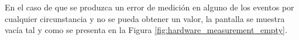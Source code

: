 \documentclass[12pt,a4paper, twoside]{report}
\begin{document}
%	
	
	En el caso de que se produzca un error de medición en alguno de los eventos por cualquier circunstancia y no se pueda obtener un valor, la pantalla se muestra vacía tal y como se presenta en la Figura \ref{fig:hardware_measurement_empty}.
	
	\newpage
	
	
\end{document}
